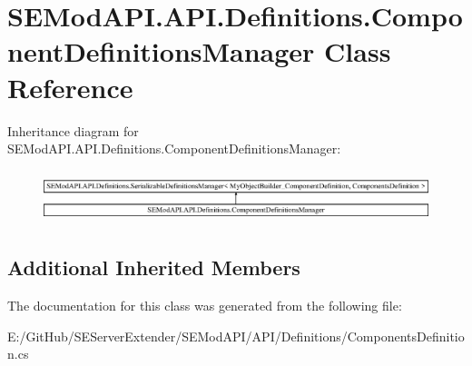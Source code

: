 \hypertarget{class_s_e_mod_a_p_i_1_1_a_p_i_1_1_definitions_1_1_component_definitions_manager}{}\section{S\+E\+Mod\+A\+P\+I.\+A\+P\+I.\+Definitions.\+Component\+Definitions\+Manager Class Reference}
\label{class_s_e_mod_a_p_i_1_1_a_p_i_1_1_definitions_1_1_component_definitions_manager}
Inheritance diagram for S\+E\+Mod\+A\+P\+I.\+A\+P\+I.\+Definitions.\+Component\+Definitions\+Manager\+:\begin{figure}[H]
\begin{center}
\leavevmode
\includegraphics[height=1.553398cm]{class_s_e_mod_a_p_i_1_1_a_p_i_1_1_definitions_1_1_component_definitions_manager}
\end{center}
\end{figure}
\subsection*{Additional Inherited Members}


The documentation for this class was generated from the following file\+:\begin{DoxyCompactItemize}
\item 
E\+:/\+Git\+Hub/\+S\+E\+Server\+Extender/\+S\+E\+Mod\+A\+P\+I/\+A\+P\+I/\+Definitions/Components\+Definition.\+cs\end{DoxyCompactItemize}
